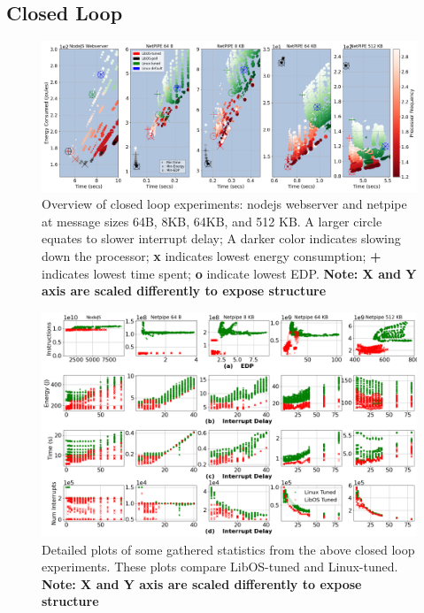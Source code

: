 \subsection{Closed Loop}
\label{sec:closed_loop}
\begin{figure}
\centering
\includegraphics[width=1\textwidth]{figures/closed_loop_overview.png}
\vspace*{-9mm}
\caption[]
{Overview of closed loop experiments: nodejs webserver and netpipe at message sizes 64B, 8KB, 64KB, and 512 KB.
A larger circle equates to slower interrupt delay;
A darker color indicates slowing down the processor;
\textbf{x} indicates lowest energy consumption;
\textbf{+} indicates lowest time spent;
\textbf{o} indicate lowest EDP.
\textbf{Note: X and Y axis are scaled differently to expose structure}}
\label{fig:closed_loop_overview}
\end{figure}
\begin{figure}
\centering
\includegraphics[width=1\textwidth]{figures/closed_detail_1.png}
\vspace*{-9mm}
\caption[]
{Detailed plots of some gathered statistics from the above closed loop experiments.
These plots compare LibOS-tuned and Linux-tuned.
\textbf{Note: X and Y axis are scaled differently to expose structure}}
\label{fig:closed_loop_detail_1}
\end{figure}
